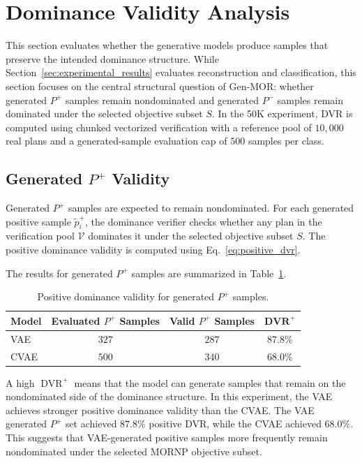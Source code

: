 \section{Dominance Validity Analysis}
\label{sec:dominance_validity_analysis}

This section evaluates whether the generative models produce samples that preserve the intended dominance structure. While Section~\ref{sec:experimental_results} evaluates reconstruction and classification, this section focuses on the central structural question of Gen-MOR: whether generated $P^{+}$ samples remain nondominated and generated $P^{-}$ samples remain dominated under the selected objective subset $S$. In the 50K experiment, DVR is computed using chunked vectorized verification with a reference pool of $10{,}000$ real plans and a generated-sample evaluation cap of $500$ samples per class.

\subsection{Generated $P^{+}$ Validity}
\label{subsec:generated_positive_validity}

Generated $P^{+}$ samples are expected to remain nondominated. For each generated positive sample $\tilde{p}^{+}_i$, the dominance verifier checks whether any plan in the verification pool $\mathcal{V}$ dominates it under the selected objective subset $S$. The positive dominance validity is computed using Eq.~\eqref{eq:positive_dvr}.

The results for generated $P^{+}$ samples are summarized in Table~\ref{tab:positive_dvr_results}.

\begin{table}[H]
\centering
\caption{Positive dominance validity for generated $P^{+}$ samples.}
\label{tab:positive_dvr_results}
\begin{tabular}{|l|c|c|c|}
\hline
\textbf{Model} & \textbf{Evaluated $P^{+}$ Samples} & \textbf{Valid $P^{+}$ Samples} & $\mathbf{DVR^{+}}$ \\
\hline
VAE & $327$ & $287$ & $87.8\%$ \\
CVAE & $500$ & $340$ & $68.0\%$ \\
\hline
\end{tabular}
\end{table}

A high $\operatorname{DVR}^{+}$ means that the model can generate samples that remain on the nondominated side of the dominance structure. In this experiment, the VAE achieves stronger positive dominance validity than the CVAE. The VAE generated $P^{+}$ set achieved $87.8\%$ positive DVR, while the CVAE achieved $68.0\%$. This suggests that VAE-generated positive samples more frequently remain nondominated under the selected MORNP objective subset.

